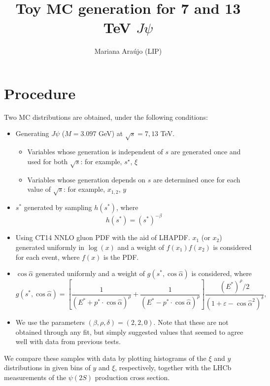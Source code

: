 \documentclass{article}
\begin{document}
\title{Toy MC generation for 7 and 13 TeV $J\psi$}
\author{Mariana Ara\'ujo (LIP)}
\maketitle

\section{Procedure}

Two MC distributions are obtained, under the following conditions:
\begin{itemize}
\item Generating $J\psi$ ($M=3.097$ GeV) at $\sqrt{s}=7,13$ TeV.
\begin{itemize}
\item Variables whose generation is independent of $s$ are generated once and used for both $\sqrt{s}$: for example, $s^\star$, $\xi$
\item Variables whose generation depends on $s$ are determined once for each value of $\sqrt{s}$: for example, $x_{1,2}$, $y$
\end{itemize}
\item $s^*$ generated by sampling $h(s^*)$, where
$$ h(s^*) = \left(s^*\right)^{-\beta}$$
\item Using CT14 NNLO gluon PDF with the aid of LHAPDF. $x_1$ (or $x_2$) generated uniformly in $\log(x)$ and a weight of $f(x_1)f(x_2)$ is considered for each event, where $f(x)$ is the PDF.
\item $\cos\hat\alpha$ generated uniformly and a weight of $g(s^*, \cos\hat\alpha)$ is considered, where
$$g(s^*, \cos\hat\alpha) = \left[\frac{1}{(E^*+p^*\cdot\cos\hat\alpha)^\rho}+\frac{1}{(E^*-p^*\cdot\cos\hat\alpha)^\rho}\right]\frac{(E^*)^\rho/2}{(1+\varepsilon-\cos\hat\alpha^2)^\delta},$$
\item We use the parameters $(\beta, \rho, \delta) = (2, 2, 0)$. Note that these are not obtained through any fit, but simply suggested values that seemed to agree well with data from previous tests.
\end{itemize}

We compare these samples with data by plotting histograms of the $\xi$ and $y$ distributions in given bins of $y$ and $\xi$, respectively, together with the LHCb measurements of the $\psi(2S)$ production cross section.
\end{document}
